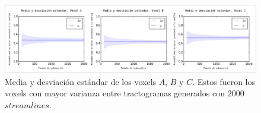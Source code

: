 \begin{figure}[h!]
   \centering
    \includegraphics[width=\textwidth]{img/med_var_all.png}
    \caption{Media y desviaci\'on est\'andar de los voxels $A$, $B$ y $C$.
             Estos fueron los voxels con mayor varianza entre tractogramas
             generados con $2000$ $streamlines$.}
    \label{fig:mv}
\end{figure}
